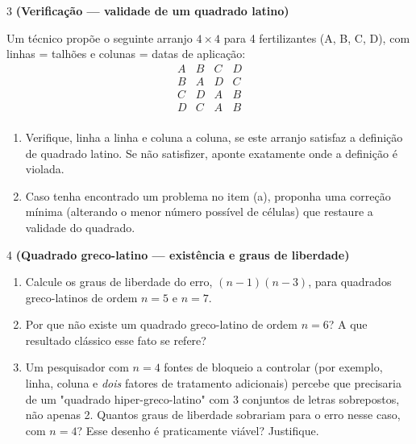 \documentclass[11pt]{article}
\begin{document}
\begin{questao}{3} \textbf{(Verificação --- validade de um quadrado latino)}

Um técnico propõe o seguinte arranjo $4\times4$ para 4 fertilizantes (A, B, C, D), com linhas =
talhões e colunas = datas de aplicação:
$$
\begin{array}{cccc}
A & B & C & D \\
B & A & D & C \\
C & D & A & B \\
D & C & A & B \\
\end{array}
$$

\begin{enumerate}[label=(\alph*)]
  \item Verifique, linha a linha e coluna a coluna, se este arranjo satisfaz a definição de
    quadrado latino. Se não satisfizer, aponte exatamente onde a definição é violada.
  \item Caso tenha encontrado um problema no item (a), proponha uma correção mínima (alterando o
    menor número possível de células) que restaure a validade do quadrado.
\end{enumerate}
\end{questao}

\begin{questao}{4} \textbf{(Quadrado greco-latino --- existência e graus de liberdade)}

\begin{enumerate}[label=(\alph*)]
  \item Calcule os graus de liberdade do erro, $(n-1)(n-3)$, para quadrados greco-latinos de
    ordem $n=5$ e $n=7$.
  \item Por que não existe um quadrado greco-latino de ordem $n=6$? A que resultado clássico esse
    fato se refere?
  \item Um pesquisador com $n=4$ fontes de bloqueio a controlar (por exemplo, linha, coluna e
    \emph{dois} fatores de tratamento adicionais) percebe que precisaria de um "quadrado
    hiper-greco-latino" com 3 conjuntos de letras sobrepostos, não apenas 2. Quantos graus de
    liberdade sobrariam para o erro nesse caso, com $n=4$? Esse desenho é praticamente viável?
    Justifique.
\end{enumerate}
\end{questao}
\end{document}
